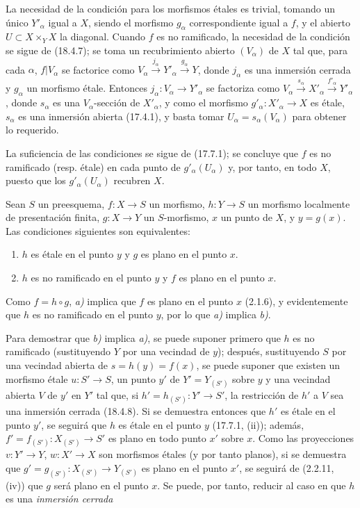 La necesidad de la condición para los morfismos étales es trivial, tomando un único $Y'_\alpha$ igual a $X$, siendo el morfismo $g_\alpha$ correspondiente igual a $f$, y el abierto $U\subset X\times_Y X$ la diagonal. Cuando $f$ es no ramificado, la necesidad de la condición se sigue de (18.4.7); se toma un recubrimiento abierto $(V_\alpha)$ de $X$ tal que, para cada $\alpha$, $f|V_\alpha$ se factorice como $V_\alpha\xrightarrow{j_\alpha}Y'_\alpha\xrightarrow{g_\alpha}Y$, donde $j_\alpha$ es una inmersión cerrada y $g_\alpha$ un morfismo étale. Entonces $j_\alpha:V_\alpha\to Y'_\alpha$ se factoriza como $V_\alpha\xrightarrow{s_\alpha}X'_\alpha\xrightarrow{f'_\alpha}Y'_\alpha$, donde $s_\alpha$ es una $V_\alpha$-sección de $X'_\alpha$, y como el morfismo $g'_\alpha:X'_\alpha\to X$ es étale, $s_\alpha$ es una inmersión abierta (17.4.1), y basta tomar $U_\alpha=s_\alpha(V_\alpha)$ para obtener lo requerido.

La suficiencia de las condiciones se sigue de (17.7.1); se concluye que $f$ es no ramificado (resp. étale) en cada punto de $g'_\alpha(U_\alpha)$ y, por tanto, en todo $X$, puesto que los $g'_\alpha(U_\alpha)$ recubren $X$.

\begin{proposition}[18.4.9]
\label{IV.18.4.9}
Sean $S$ un preesquema, $f:X\to S$ un morfismo, $h:Y\to S$ un morfismo localmente de presentación finita, $g:X\to Y$ un $S$-morfismo, $x$ un punto de $X$, y $y=g(x)$. Las condiciones siguientes son equivalentes:
\begin{enumerate}
  \item[\textup{a)}] $h$ es étale en el punto $y$ y $g$ es plano en el punto $x$.
  \item[\textup{b)}] $h$ es no ramificado en el punto $y$ y $f$ es plano en el punto $x$.
\end{enumerate}
\end{proposition}

Como $f=h\circ g$, \emph{a)} implica que $f$ es plano en el punto $x$ (2.1.6), y evidentemente que $h$ es no ramificado en el punto $y$, por lo que \emph{a)} implica \emph{b)}.

Para demostrar que \emph{b)} implica \emph{a)}, se puede suponer primero que $h$ es no ramificado (sustituyendo $Y$ por una vecindad de $y$); después, sustituyendo $S$ por una vecindad abierta de $s=h(y)=f(x)$, se puede suponer que existen un morfismo étale $u:S'\to S$, un punto $y'$ de $Y'=Y_{(S')}$ sobre $y$ y una vecindad abierta $V$ de $y'$ en $Y'$ tal que, si $h'=h_{(S')}:Y'\to S'$, la restricción de $h'$ a $V$ sea una inmersión cerrada (18.4.8). Si se demuestra entonces que $h'$ es étale en el punto $y'$, se seguirá que $h$ es étale en el punto $y$ (17.7.1, (ii)); además, $f'=f_{(S')}:X_{(S')}\to S'$ es plano en todo punto $x'$ sobre $x$. Como las proyecciones $v:Y'\to Y$, $w:X'\to X$ son morfismos étales (y por tanto planos), si se demuestra que $g'=g_{(S')}:X_{(S')}\to Y_{(S')}$ es plano en el punto $x'$, se seguirá de (2.2.11, (iv)) que $g$ será plano en el punto $x$. Se puede, por tanto, reducir al caso en que $h$ es una \emph{inmersión cerrada}

